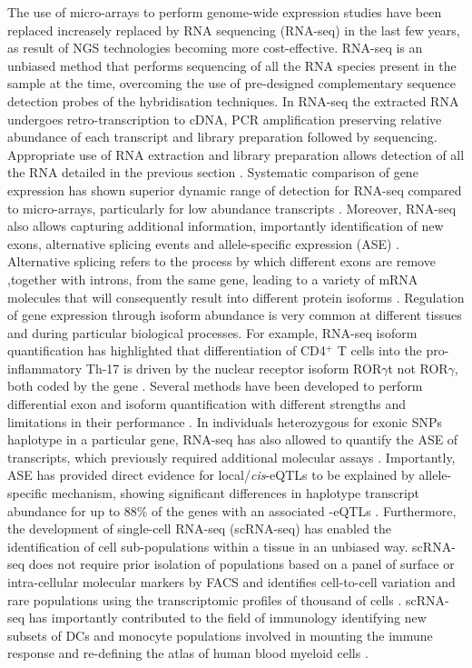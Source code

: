 The use of micro-arrays to perform genome-wide expression studies have been replaced increasely replaced by RNA sequencing (RNA-seq) in the last few years, as result of NGS technologies becoming more cost-effective. RNA-seq is an unbiased method that performs sequencing of all the RNA species present in the sample at the time, overcoming the use of pre-designed complementary sequence detection probes of the hybridisation techniques. In RNA-seq the extracted RNA undergoes retro-transcription to cDNA, PCR amplification preserving relative abundance of each transcript and library preparation followed by sequencing. Appropriate use of RNA extraction and library preparation allows detection of all the RNA detailed in the previous section \parencite{}. Systematic comparison of gene expression has shown superior dynamic range of detection for RNA-seq compared to micro-arrays, particularly for low abundance transcripts \parencite{Zhao2014}. Moreover, RNA-seq also allows capturing additional information, importantly identification of new exons, alternative splicing events and allele-specific expression (ASE) . Alternative splicing refers to the process by which different exons are remove ,together with introns, from the same gene, leading to a variety of mRNA molecules that will consequently result into different protein isoforms \parencite{Pan2008}. Regulation of gene expression through isoform abundance is very common at different tissues and during particular biological processes. For example, RNA-seq isoform quantification has highlighted that differentiation of CD4$^+$ T cells into the pro-inflammatory Th-17 is driven by the nuclear receptor isoform ROR$\gamma$t not ROR$\gamma$, both coded by the  gene \parencite{Zhao2014}. Several methods have been developed to perform differential exon and isoform quantification with different strengths and limitations in their performance \parencite{Steijger2013,Ding2017}. In individuals heterozygous for exonic SNPs haplotype in a particular gene, RNA-seq has also allowed to quantify the ASE of transcripts, which previously required additional molecular assays \parencite{Yan2002}. Importantly, ASE has provided direct evidence for local/\textit{cis}-eQTLs to be explained by allele-specific mechanism, showing significant differences in haplotype transcript abundance for up to 88\% of the genes with an associated -eQTLs \parencite{Pickrell2010}. Furthermore, the development of single-cell RNA-seq (scRNA-seq) has enabled the identification of cell sub-populations within a tissue in an unbiased way. scRNA-seq does not require prior isolation of populations based on a panel of surface or intra-cellular molecular markers by FACS and identifies cell-to-cell variation and rare populations using the transcriptomic profiles of thousand of cells \parencite{Tang2009}. scRNA-seq has importantly contributed to the field of immunology identifying new subsets of DCs and monocyte populations involved in mounting the immune response and re-defining the atlas of human blood myeloid cells \parencite{Jaitin2014, Villani2017}. 
